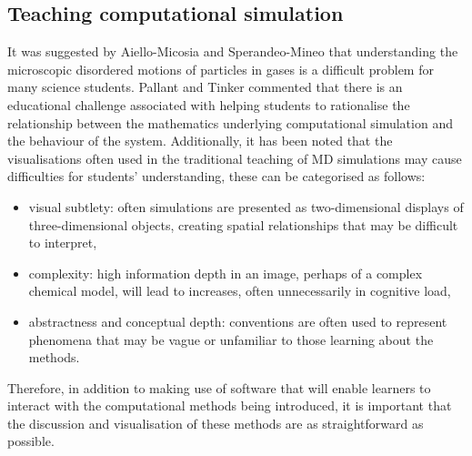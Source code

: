 \subsection{Teaching computational simulation}
It was suggested by Aiello-Micosia and Sperandeo-Mineo\autocite{aiello-nicosia_computer_1985} that understanding the microscopic disordered motions of particles in gases is a difficult problem for many science students.
Pallant and Tinker\autocite{pallant_reasoning_2004} commented that there is an educational challenge associated with helping students to rationalise the relationship between the mathematics underlying computational simulation and the behaviour of the system.
Additionally, it has been noted that the visualisations often used in the traditional teaching of MD simulations may cause difficulties for students' understanding, these can be categorised as follows:\autocite{jones_molecular_2005}
\begin{itemize}
\item visual subtlety: often simulations are presented as two-dimensional displays of three-dimensional objects, creating spatial relationships that may be difficult to interpret,
\item complexity: high information depth in an image, perhaps of a complex chemical model, will lead to increases, often unnecessarily in cognitive load,
\item abstractness and conceptual depth: conventions are often used to represent phenomena that may be vague or unfamiliar to those learning about the methods.
\end{itemize}
Therefore, in addition to making use of software that will enable learners to interact with the computational methods being introduced, it is important that the discussion and visualisation of these methods are as straightforward as possible.

